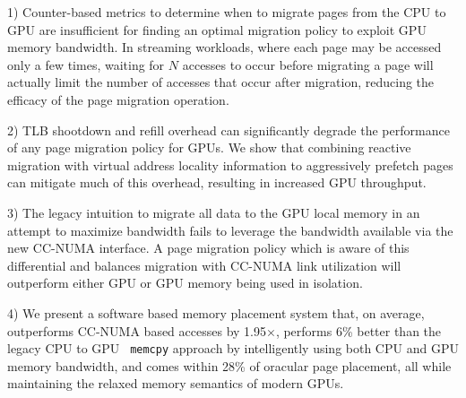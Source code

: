 1) Counter-based metrics to determine when to migrate pages from the CPU to GPU 
are insufficient for finding an optimal migration policy to exploit GPU memory bandwidth. 
In streaming workloads, where each page
may be accessed only a few times, waiting for $N$ accesses to occur before
migrating a page will actually limit the number of accesses that occur after
migration, reducing the efficacy of the page migration operation.

2) TLB shootdown and refill overhead can significantly degrade the
performance of any page migration policy for GPUs\@. We show that combining reactive
migration with virtual address locality information to aggressively prefetch pages
can mitigate much of this overhead, resulting in increased GPU throughput.

3) The legacy intuition to migrate all data to the GPU local memory in an attempt to maximize bandwidth fails to leverage
the bandwidth available via the new CC-NUMA interface.  A page migration policy which 
is aware of this differential and balances migration with CC-NUMA link
utilization will outperform either GPU or GPU memory being used in isolation.

4) We present a software based memory placement system that, on average, outperforms CC-NUMA based
accesses by 1.95$\times$, performs 6\% better than the legacy CPU to GPU {\tt
memcpy} approach by 
intelligently using both CPU and GPU memory bandwidth, and comes within 28\% of oracular page placement,
all while maintaining the relaxed memory semantics of modern GPUs.
